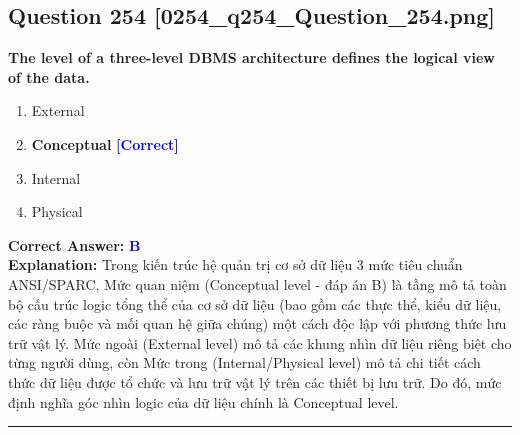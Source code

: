\documentclass[11pt,a4paper]{article}
\begin{document}
\begin{minipage}{\textwidth}
\subsection*{Question 254 \quad \footnotesize{[0254\_q254\_Question\_254.png]}}
\noindent \textbf{The level of a three-level DBMS architecture defines the logical view of the data.}

\begin{enumerate}[label=\Alph*.]
    \item External
    \item \textbf{Conceptual} \hfill \textcolor{blue}{\textbf{[Correct]}}
    \item Internal
    \item Physical
\end{enumerate}

\noindent \textbf{Correct Answer:} \textcolor{blue}{\textbf{B}} \\[2pt]
\noindent \textbf{Explanation:} Trong kiến trúc hệ quản trị cơ sở dữ liệu 3 mức tiêu chuẩn ANSI/SPARC, Mức quan niệm (Conceptual level - đáp án B) là tầng mô tả toàn bộ cấu trúc logic tổng thể của cơ sở dữ liệu (bao gồm các thực thể, kiểu dữ liệu, các ràng buộc và mối quan hệ giữa chúng) một cách độc lập với phương thức lưu trữ vật lý. Mức ngoài (External level) mô tả các khung nhìn dữ liệu riêng biệt cho từng người dùng, còn Mức trong (Internal/Physical level) mô tả chi tiết cách thức dữ liệu được tổ chức và lưu trữ vật lý trên các thiết bị lưu trữ. Do đó, mức định nghĩa góc nhìn logic của dữ liệu chính là Conceptual level.

\par\vspace{0.3cm}
\hrule
\vspace{0.3cm}
\end{minipage}
\end{document}
